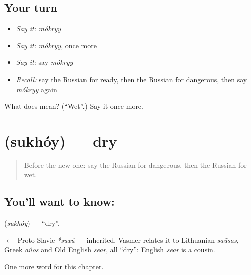 \subsection*{Your turn}
\begin{itemize}
\raggedright
  \item \emph{Say it:} \emph{mókryy}
  \item \emph{Say it:} \emph{mókryy}, once more
  \item \emph{Say it:} say \emph{mókryy}
  \item \emph{Recall:} say the Russian for ready, then the Russian for dangerous, then say \emph{mókryy} again
\end{itemize}

\begin{tcolorbox}[breakable,colback=teal!4,colframe=teal!35!black,title={Before you move on}]
What does  mean? (\textquotedblleft{}Wet\textquotedblright{}.) Say it once more.
\end{tcolorbox}
\section[\texorpdfstring{\ru{сухой} (sukhóy)}{сухой (sukhóy)}]{ (sukhóy) — dry}

\label{lesson:RU-C128-dry}



\begin{quote}
Before the new one: say the Russian for dangerous, then the Russian for wet.
\end{quote}

\subsection*{You'll want to know: }
\textbf{} (\emph{sukhóy}) — \textquotedblleft{}dry\textquotedblright{}.

\begin{cousinweb}
\textbf{} $\leftarrow$ Proto-Slavic \emph{*suxŭ} — inherited. Vasmer relates it to Lithuanian \emph{saũsas}, Greek \emph{aûos} and Old English \emph{sēar}, all \textquotedblleft{}dry\textquotedblright{}: English \emph{sear} is a cousin.
\end{cousinweb}

\begin{grammarlens}[title={What you've built}]
One more word for this chapter.
\end{grammarlens}

